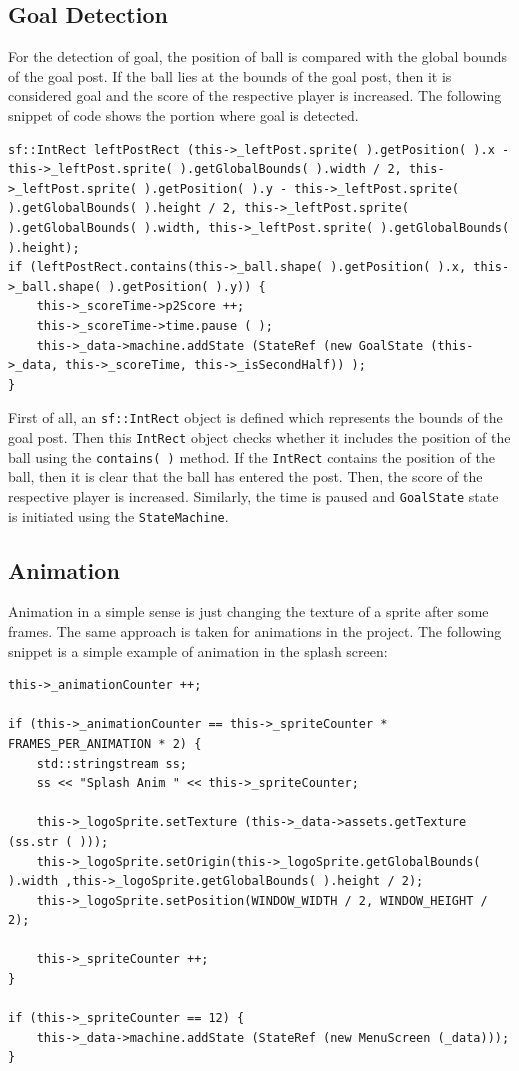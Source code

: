 \documentclass[main]{subfiles}
\begin{document}
\subsection{Goal Detection}
For the detection of goal, the position of ball is compared with the global bounds of the goal post. If the ball lies at the bounds of the goal post, then it is considered goal and the score of the respective player is increased. The following snippet of code shows the portion where goal is detected. 

\begin{verbatim}
sf::IntRect leftPostRect (this->_leftPost.sprite( ).getPosition( ).x - this->_leftPost.sprite( ).getGlobalBounds( ).width / 2, this->_leftPost.sprite( ).getPosition( ).y - this->_leftPost.sprite( ).getGlobalBounds( ).height / 2, this->_leftPost.sprite( ).getGlobalBounds( ).width, this->_leftPost.sprite( ).getGlobalBounds( ).height);
if (leftPostRect.contains(this->_ball.shape( ).getPosition( ).x, this->_ball.shape( ).getPosition( ).y)) {
    this->_scoreTime->p2Score ++;
    this->_scoreTime->time.pause ( );
    this->_data->machine.addState (StateRef (new GoalState (this->_data, this->_scoreTime, this->_isSecondHalf)) );
}
\end{verbatim}

First of all, an \texttt{sf::IntRect} object is defined which represents the bounds of the goal post. Then this \texttt{IntRect} object checks whether it includes the position of the ball using the \texttt{contains( )} method. If the \texttt{IntRect} contains the position of the ball, then it is clear that the ball has entered the post. Then, the score of the respective player is increased. Similarly, the time is paused and \texttt{GoalState} state is initiated using the \texttt{StateMachine}. 

\subsection{Animation}

Animation in a simple sense is just changing the texture of a sprite after some frames. The same approach is taken for animations in the project. The following snippet is a simple example of animation in the splash screen:

\begin{verbatim}
this->_animationCounter ++;

if (this->_animationCounter == this->_spriteCounter * FRAMES_PER_ANIMATION * 2) {
    std::stringstream ss;
    ss << "Splash Anim " << this->_spriteCounter;

    this->_logoSprite.setTexture (this->_data->assets.getTexture (ss.str ( )));
    this->_logoSprite.setOrigin(this->_logoSprite.getGlobalBounds( ).width ,this->_logoSprite.getGlobalBounds( ).height / 2);
    this->_logoSprite.setPosition(WINDOW_WIDTH / 2, WINDOW_HEIGHT / 2);

    this->_spriteCounter ++;
}

if (this->_spriteCounter == 12) {
    this->_data->machine.addState (StateRef (new MenuScreen (_data)));
}

\end{verbatim}
\end{document}
